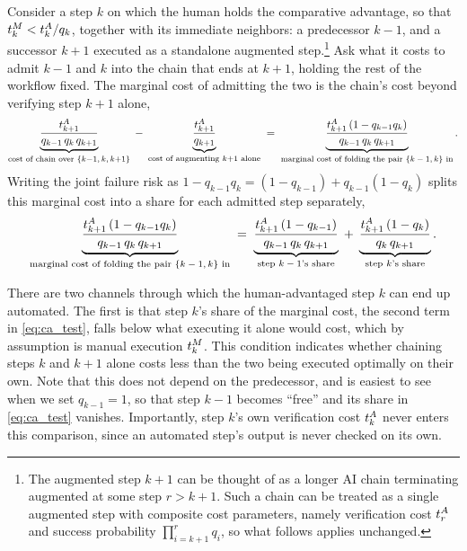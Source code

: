 Consider a step $k$ on which the human holds the comparative advantage, so that $t^{M}_{k} < t^{A}_{k}/q_k$, together with its immediate neighbors: a predecessor $k-1$, and a successor $k+1$ executed as a standalone augmented step.\footnote{The augmented step $k+1$ can be thought of as a longer AI chain terminating augmented at some step $r > k+1$. Such a chain can be treated as a single augmented step with composite cost parameters, namely verification cost $t^{A}_{r}$ and success probability $\prod_{i=k+1}^{r} q_i$, so what follows applies unchanged.}
Ask what it costs to admit $k-1$ and $k$ into the chain that ends at $k+1$, holding the rest of the workflow fixed.
The marginal cost of admitting the two is the chain's cost beyond verifying step $k+1$ alone,
\[
\underbrace{\frac{t^{A}_{k+1}}{q_{k-1}\,q_k\,q_{k+1}}}_{\text{cost of chain over } \{k-1,\,k,\,k+1\}}
\;-\;
\underbrace{\frac{t^{A}_{k+1}}{q_{k+1}}}_{\text{cost of augmenting } k+1 \text{ alone}}
\;=\;
\underbrace{\frac{t^{A}_{k+1}\,(1-q_{k-1}q_k)}{q_{k-1}\,q_k\,q_{k+1}}}_{\text{marginal cost of folding the pair $\{k-1, k\}$ in}}.
\]
Writing the joint failure risk as $1-q_{k-1}q_k = (1-q_{k-1}) + q_{k-1}(1-q_k)$ splits this marginal cost into a share for each admitted step separately,
\begin{equation}
\label{eq:ca_test}
\underbrace{\frac{t^{A}_{k+1}\,(1-q_{k-1}q_k)}{q_{k-1}\,q_k\,q_{k+1}}}_{\text{marginal cost of folding the pair $\{k-1, k\}$ in}}
\;=\;
\underbrace{\frac{t^{A}_{k+1}\,(1-q_{k-1})}{q_{k-1}\,q_k\,q_{k+1}}}_{\text{step $k-1$'s share}}
\;+\;
\underbrace{\frac{t^{A}_{k+1}\,(1-q_k)}{q_k\,q_{k+1}}}_{\text{step $k$'s share}}.
\end{equation}

There are two channels through which the human-advantaged step $k$ can end up automated.
The first is that step $k$'s share of the marginal cost, the second term in \eqref{eq:ca_test}, falls below what executing it alone would cost, which by assumption is manual execution $t^{M}_{k}$.
This condition indicates whether chaining steps $k$ and $k+1$ alone costs less than the two being executed optimally on their own.
Note that this does not depend on the predecessor, and is easiest to see when we set $q_{k-1}=1$, so that step $k-1$ becomes ``free'' and its share in \eqref{eq:ca_test} vanishes.
Importantly, step $k$'s own verification cost $t^{A}_{k}$ never enters this comparison, since an automated step's output is never checked on its own.

